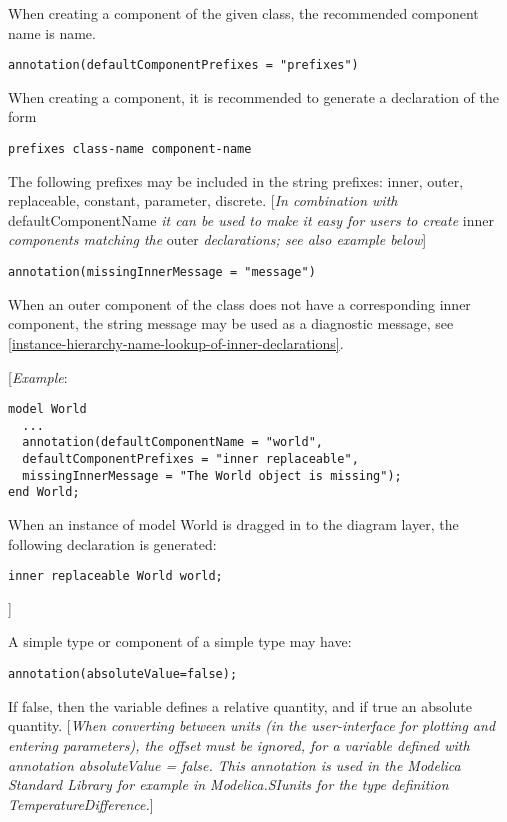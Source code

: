 When creating a component of the given class, the recommended component
name is name.
\begin{lstlisting}[language=modelica]
  annotation(defaultComponentPrefixes = "prefixes")
\end{lstlisting}

When creating a component, it is recommended to generate a declaration
of the form
\begin{lstlisting}[language=modelica]
  prefixes class-name component-name
\end{lstlisting}

The following prefixes may be included in the string prefixes: inner,
outer, replaceable, constant, parameter, discrete. {[}\emph{In
combination with} defaultComponentName \emph{it can be used to make it
easy for users to create} inner \emph{components matching the} outer
\emph{declarations; see also example below}{]}
\begin{lstlisting}[language=modelica]
  annotation(missingInnerMessage = "message")
\end{lstlisting}

When an outer component of the class does not have a corresponding inner
component, the string message may be used as a diagnostic message, see
\ref{instance-hierarchy-name-lookup-of-inner-declarations}.

{[}\emph{Example}:

\begin{lstlisting}[language=modelica]
model World
  ...
  annotation(defaultComponentName = "world",
  defaultComponentPrefixes = "inner replaceable",
  missingInnerMessage = "The World object is missing");
end World;
\end{lstlisting}
When an instance of model World is dragged in to the diagram layer, the
following declaration is generated:
\begin{lstlisting}[language=modelica]
  inner replaceable World world;
\end{lstlisting}

{]}

A simple type or component of a simple type may have:
\begin{lstlisting}[language=modelica]
  annotation(absoluteValue=false);
\end{lstlisting}

If false, then the variable defines a relative quantity, and if true an
absolute quantity. {[}\emph{When converting between units (in the
user-interface for plotting and entering parameters), the offset must be
ignored, for a variable defined with annotation absoluteValue = false.
This annotation is used in the Modelica Standard Library for example in
Modelica.SIunits for the type definition TemperatureDifference.}{]}

